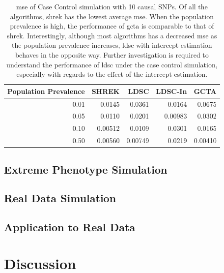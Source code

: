 		\begin{table}
			\centering
			\begin{tabular}{rrrrr}
				\toprule
				Population Prevalence&	SHREK&	LDSC&	LDSC-In&	GCTA \\
				\midrule
				0.01	&	0.0145	&	0.0361	&	0.0164	&	0.0675\\
				0.05	&	0.0110	&	0.0201	&	0.00983	&	0.0302\\
				0.10	&	0.00512	&	0.0109	&	0.0301	&	0.0165\\
				0.50	&	0.00560	&	0.00749	&	0.0219	&	0.00410\\
				\bottomrule
			\end{tabular}
			\caption[MSE of Case Control Simulation with 10 causal SNPs]{
				\Gls{mse} of Case Control simulation with 10 causal SNPs.
				Of all the algorithms, \gls{shrek} has the lowest average \gls{mse}.
				When the population prevalence is high, the performance of \gls{gcta} is comparable to that of \gls{shrek}.
				Interestingly, although most algorithms has a decreased \gls{mse} as the population prevalence increases, \gls{ldsc} with intercept estimation behaves in the opposite way. 
				Further investigation is required to understand the performance of \gls{ldsc} under the case control simulation, especially with regards to the effect of the intercept estimation.
			}
			\label{tab:mseCC10}
		\end{table}
		
		  
		
		
		
		
		
		\subsection{Extreme Phenotype Simulation}
		
		\subsection{Real Data Simulation}
		\subsection{Application to Real Data}
	\section{Discussion}

	
